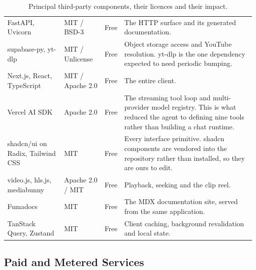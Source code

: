 \documentclass[11pt,a4paper]{article}
\begin{document}
\begin{table}[htbp]
\begin{tabularx}{\textwidth}{@{}L{2.9cm}L{1.9cm}L{1.3cm}X@{}}
FastAPI, Uvicorn & MIT / BSD-3 & Free & The HTTP surface and its generated documentation. \\
supabase-py, yt-dlp & MIT / Unlicense & Free & Object storage access and YouTube resolution. yt-dlp is the one dependency expected to need periodic bumping. \\
Next.js, React, TypeScript & MIT / Apache 2.0 & Free & The entire client. \\
Vercel AI SDK & Apache 2.0 & Free & The streaming tool loop and multi-provider model registry. This is what reduced the agent to defining nine tools rather than building a chat runtime. \\
shadcn/ui on Radix, Tailwind CSS & MIT & Free & Every interface primitive. shadcn components are vendored into the repository rather than installed, so they are ours to edit. \\
video.js, hls.js, mediabunny & Apache 2.0 / MIT & Free & Playback, seeking and the clip reel. \\
Fumadocs & MIT & Free & The MDX documentation site, served from the same application. \\
TanStack Query, Zustand & MIT & Free & Client caching, background revalidation and local state. \\
\bottomrule
\end{tabularx}
\caption{Principal third-party components, their licences and their impact.}
\end{table}

\subsection{Paid and Metered Services}
\end{document}
